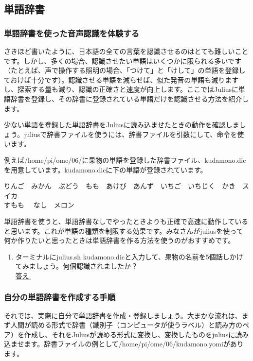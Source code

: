 \subsection{単語辞書}
\subsubsection{単語辞書を使った音声認識を体験する}
さきほど書いたように、日本語の全ての言葉を認識させるのはとても難しいことです。しかし、多くの場合、認識させたい単語はいくつかに限られる多いです（たとえば、声で操作する照明の場合、「つけて」と「けして」の単語を登録しておけば十分です）。認識させる単語を減らせば、似た発音の単語も減りますし、探索する量も減り、認識の正確さと速度が向上します。ここではJuliusに単語辞書を登録し、その辞書に登録されている単語だけを認識させる方法を紹介します。

少ない単語を登録した単語辞書をJuliusに読み込ませたときの動作を確認しましょう。juliusで辞書ファイルを使うには、辞書ファイルを引数にして、命令を使います。\\

例えば/home/pi/ome/06/に果物の単語を登録した辞書ファイル、kudamono.dicを用意しています。kudamono.dicに下の単語が登録されています。
\begin{center}
	りんご　みかん　ぶどう　もも　あけび　あんず　いちご　いちじく　かき　スイカ\\すもも　	なし　メロン
\end{center}

単語辞書を使うと、単語辞書なしでやったときよりも正確で高速に動作していると思います。これが単語の種類を制限する効果です。みなさんがjuliusを使って何か作りたいと思ったときは単語辞書を作る方法を使うのがおすすめです。\\

\begin{tcolorbox}[title=\useOmetoi]
\begin{enumerate}
\item ターミナルにjulius.sh kudamono.dicと入力して、果物の名前を5個話しかけてみましょう。何個認識されましたか？\\ \underline{答え.\hspace{0.8\linewidth}}
\end{enumerate}
\end{tcolorbox}

\subsubsection{自分の単語辞書を作成する手順}
それでは、実際に自分で単語辞書を作成・登録しましょう。大まかな流れは、まず人間が読める形式で辞書（識別子（コンピュータが使うラベル）と読み方のペア）を作成し、それをJuliusが読める形式に変換し、変換したものをjuliusに読み込ませます。辞書ファイルの例として/home/pi/ome/06/kudamono.yomiがあります。\\

